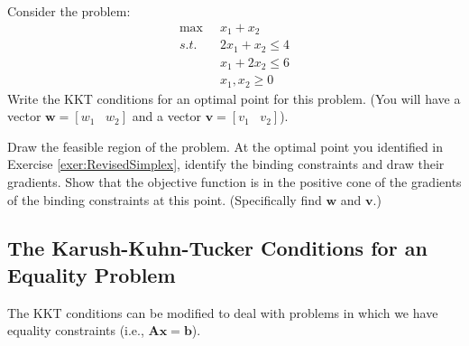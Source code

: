 \begin{exercise} Consider the problem:
\begin{displaymath}
\begin{aligned}
\max\;\;&x_1 + x_2\\
s.t.\;\;&2x_1 + x_2 \leq 4\\
&x_1 + 2x_2 \leq 6\\
&x_1, x_2 \geq 0
\end{aligned}
\end{displaymath}
Write the KKT conditions for an optimal point for this problem. (You will have a vector $\mathbf{w} = [w_1 \;\;\; w_2]$ and a vector $\mathbf{v} = [v_1\;\;\;v_2]$). 

Draw the feasible region of the problem. At the optimal point you identified in Exercise \ref{exer:RevisedSimplex}, identify the binding constraints and draw their gradients. Show that the objective function is in the positive cone of the gradients of the binding constraints at this point. (Specifically find $\mathbf{w}$ and $\mathbf{v}$.)
\label{exer:FindKKT}
\end{exercise}

\subsection*{The Karush-Kuhn-Tucker Conditions for an Equality Problem}
The KKT conditions can be modified to deal with problems in which we have equality constraints (i.e., $\mathbf{A}\mathbf{x} = \mathbf{b}$).

